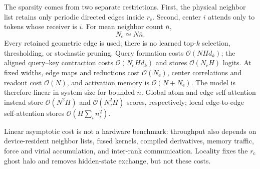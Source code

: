 \documentclass[aps,prx,preprint,notitlepage,superscriptaddress,nofootinbib,floatfix]{revtex4-2}
\newif\ifshowrevisions
\newenvironment{draftthirtyoneblock}
  {\ifshowrevisions\color{draftthirtyonecolor}\fi}
  {}
\begin{document}
\begin{draftthirtyoneblock}
The sparsity comes from two separate restrictions. First, the physical
neighbor list retains only periodic directed edges inside \(r_{\mathrm c}\).
Second, center \(i\) attends only to tokens whose receiver is \(i\). For mean
neighbor count \(\overline n\),
\begin{equation}
 N_{\mathrm e}\simeq N\overline n .
 \label{eq:app-linear-edges}
\end{equation}
Every retained geometric edge is used; there is no learned top-\(k\)
selection, thresholding, or stochastic pruning. Query formation costs
\(\mathcal O(NHd_k)\); the aligned query--key contraction costs
\(\mathcal O(N_{\mathrm e}Hd_k)\) and stores
\(\mathcal O(N_{\mathrm e}H)\) logits. At fixed widths, edge maps and
reductions cost \(\mathcal O(N_{\mathrm e})\), center correlations and
readout cost \(\mathcal O(N)\), and activation memory is
\(\mathcal O(N+N_{\mathrm e})\). The model is therefore linear in system size
for bounded \(\overline n\). Global atom and edge self-attention instead store
\(\mathcal O(N^2H)\) and \(\mathcal O(N_{\mathrm e}^2H)\) scores,
respectively; local edge-to-edge self-attention stores
\(\mathcal O(H\sum_i n_i^2)\).

Linear asymptotic cost is not a hardware benchmark: throughput also depends
on device-resident neighbor lists, fused kernels, compiled derivatives,
memory traffic, force and virial accumulation, and inter-rank communication.
Locality fixes the \(r_{\mathrm c}\) ghost halo and removes hidden-state
exchange, but not these costs.

\end{draftthirtyoneblock}
\end{document}
